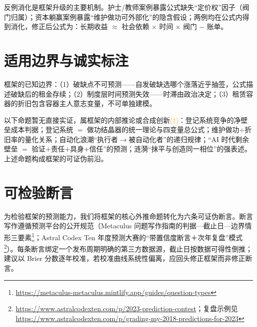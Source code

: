 \documentclass[11pt]{ctexart}
\newcommand{\infmark}{\textcolor{orange}{(\(\dagger\))}}
\begin{document}
反例消化是框架升级的主要机制。护士/教师案例暴露公式缺失“定价权”因子（阀门归属）；资本躺赢案例暴露“维护做功可外部化”的隐含假设；两例均在公式内得到消化，修正后公式为：长期收益 $\approx$ 社会依赖 $\times$ 时间 $\times$ 阀门 $-$ 账单。

\section{适用边界与诚实标注}
框架的已知边界：（1）破缺点不可预测——自发破缺选哪个涨落近乎抽签，公式描述破缺后的租金存续；（2）制度层时间预测失效——时滞由政治决定；（3）租赁容器的折旧包含容器主人意志变量，不可单独建模。

以下命题暂无直接实证，属框架的内部推论或合成创新\infmark：登记系统竞争的净壁垒成本判据；登记系统 $=$ 做功结晶器的统一理论与四变量总公式；维护做功$\div$折旧率的量化关系；自动化浪潮“执行者$\to$被自动化者”的递归规律；“AI 时代剩余壁垒 $=$ 验证$+$责任$+$具身$+$信任”的预测；涟漪“抹平与创造同一相位”的强表述。上述命题构成框架的可证伪前沿。

\section{可检验断言}
为检验框架的预测能力，我们将框架的核心外推命题转化为六条可证伪断言。断言写作遵循预测平台的公开规范（Metaculus 问题写作指南的判据—截止日—边界情形三要素\footnote{\url{https://metaculus-metaculus.mintlify.app/guides/question-types}}；Astral Codex Ten 年度预测大赛的“带置信度断言＋次年复盘”模式\footnote{\url{https://www.astralcodexten.com/p/2023-prediction-contest}；复盘示例见 \url{https://www.astralcodexten.com/p/grading-my-2018-predictions-for-2023}}）。每条断言绑定一个发布周期明确的第三方数据源，截止日按数据可得性倒推；建议以 Brier 分数逐年校准，若校准曲线系统性偏离，应回头修正框架而非修正断言。
\end{document}
